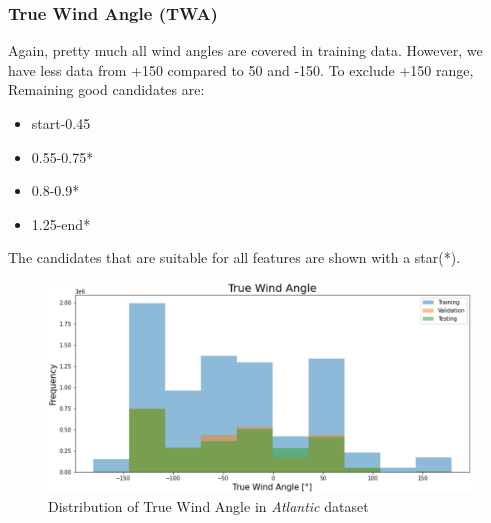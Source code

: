 \subsubsection{True Wind Angle (TWA)}
Again, pretty much all wind angles are covered in training data. However, we have less data from +150 compared to 50 and -150.
To exclude +150 range, Remaining good candidates are:
\begin{itemize}
    \item start-0.45
    \item 0.55-0.75*
    \item 0.8-0.9*
    \item 1.25-end*
\end{itemize}
The candidates that are suitable for all features are shown with a star(*).

\begin{figure}[h]
\centering
\includegraphics[width = \hsize]{figures/distributions/atlantic-TWA.png}
\caption{Distribution of True Wind Angle in \textit{Atlantic} dataset \cite{charles}}
\label{fig:atlantic-tws}
\end{figure}

